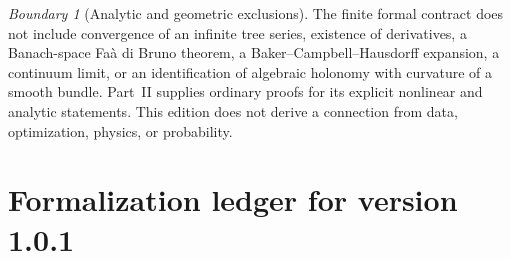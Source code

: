 \documentclass[11pt,a4paper]{article}
\theoremstyle{plain}
\theoremstyle{definition}
\theoremstyle{remark}
\newtheorem{boundary}[boundary]{Boundary}
\begin{document}
\begin{boundary}[Analytic and geometric exclusions]
The finite formal contract does not include convergence of an infinite tree series, existence
of derivatives, a Banach-space Fa\`a di Bruno theorem, a Baker--Campbell--Hausdorff
expansion, a continuum limit, or an identification of algebraic holonomy with
curvature of a smooth bundle. Part~II supplies ordinary proofs for its explicit nonlinear and analytic statements. This edition does not derive a connection from
data, optimization, physics, or probability.
\end{boundary}

\section{Formalization ledger for version 1.0.1}
\label{sec:ledger}
\end{document}
